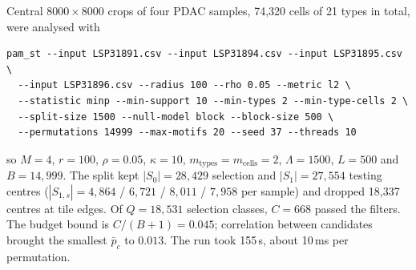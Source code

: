 \documentclass[11pt,a4paper]{article}
\theoremstyle{remark}
\newcommand{\mtypes}{m_{\mathrm{types}}}
\newcommand{\mcells}{m_{\mathrm{cells}}}
\begin{document}
Central $8000\times8000$ crops of four PDAC samples, 74{,}320 cells of 21 types
in total, were analysed with
\begin{center}
\begin{minipage}{0.92\linewidth}
\footnotesize
\begin{verbatim}
pam_st --input LSP31891.csv --input LSP31894.csv --input LSP31895.csv \
  --input LSP31896.csv --radius 100 --rho 0.05 --metric l2 \
  --statistic minp --min-support 10 --min-types 2 --min-type-cells 2 \
  --split-size 1500 --null-model block --block-size 500 \
  --permutations 14999 --max-motifs 20 --seed 37 --threads 10
\end{verbatim}
\end{minipage}
\end{center}
so $M=4$, $r=100$, $\rho=0.05$, $\kappa=10$, $\mtypes=\mcells=2$,
$\Lambda=1500$, $L=500$ and $B=14{,}999$. The split kept $|S_0|=28{,}429$
selection and $|S_1|=27{,}554$ testing centres
($|S_{1,s}|=4{,}864$ / $6{,}721$ / $8{,}011$ / $7{,}958$ per sample) and
dropped 18{,}337 centres at tile edges. Of $Q=18{,}531$ selection classes,
$C=668$ passed the filters. The budget bound is $C/(B+1)=0.045$; correlation
between candidates brought the smallest $\bar p_c$ to $0.013$. The run took
155\,s, about 10\,ms per permutation.
\end{document}
